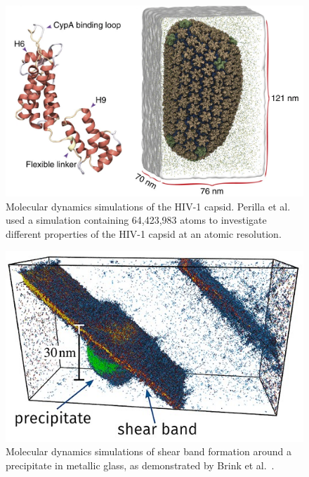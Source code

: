 \begin{multicols*}{2}
      \begin{figure}[H]
            \centering
            \includegraphics[width=1\columnwidth, trim={0cm 0 0cm 0cm}]{figures/Intro/HIV-1.png}
            \caption{Molecular dynamics simulations of the HIV-1 capsid. Perilla et al.~\cite{Perilla2017} used a simulation containing 64,423,983 atoms to investigate different properties of the HIV-1 capsid at an atomic resolution.}
            \label{fig:hiv_capsid}
      \end{figure}

      \begin{figure}[H]
            \centering
            \includegraphics[width=1\columnwidth,trim={0cm 0 0cm 0cm}]{figures/Intro/metallic-glass-crack.jpg}
            \caption{Molecular dynamics simulations of shear band formation around a precipitate in metallic glass, as demonstrated by Brink et al.~\cite{Brink2016}.}
            \label{fig:md_simulation_loop}
      \end{figure}
\end{multicols*}

